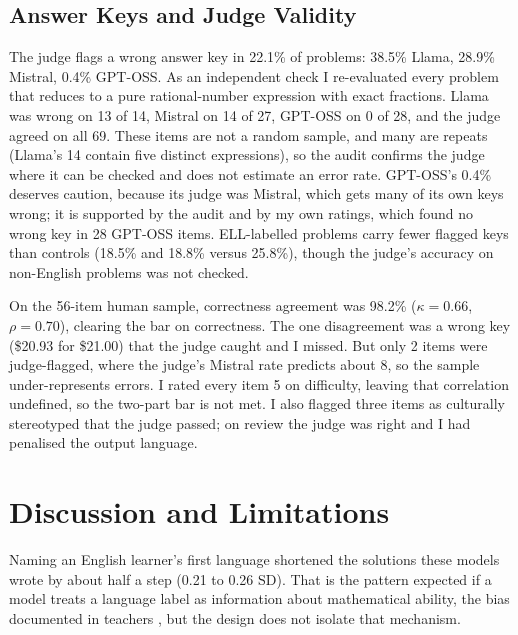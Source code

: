 \documentclass[runningheads,a4paper]{llncs}
\begin{document}
\subsection{Answer Keys and Judge Validity}\label{sec:judge}

The judge flags a wrong answer key in 22.1\% of problems: 38.5\% Llama, 28.9\% Mistral, 0.4\% GPT-OSS. As an independent check I re-evaluated every problem that reduces to a pure rational-number expression with exact fractions. Llama was wrong on 13 of 14, Mistral on 14 of 27, GPT-OSS on 0 of 28, and the judge agreed on all 69. These items are not a random sample, and many are repeats (Llama's 14 contain five distinct expressions), so the audit confirms the judge where it can be checked and does not estimate an error rate. GPT-OSS's 0.4\% deserves caution, because its judge was Mistral, which gets many of its own keys wrong; it is supported by the audit and by my own ratings, which found no wrong key in 28 GPT-OSS items. ELL-labelled problems carry fewer flagged keys than controls (18.5\% and 18.8\% versus 25.8\%), though the judge's accuracy on non-English problems was not checked.

On the 56-item human sample, correctness agreement was 98.2\% ($\kappa=0.66$, $\rho=0.70$), clearing the bar on correctness. The one disagreement was a wrong key (\$20.93 for \$21.00) that the judge caught and I missed. But only 2 items were judge-flagged, where the judge's Mistral rate predicts about 8, so the sample under-represents errors. I rated every item 5 on difficulty, leaving that correlation undefined, so the two-part bar is not met. I also flagged three items as culturally stereotyped that the judge passed; on review the judge was right and I had penalised the output language.

\section{Discussion and Limitations}\label{sec:discussion}

Naming an English learner's first language shortened the solutions these models wrote by about half a step (0.21 to 0.26 SD). That is the pattern expected if a model treats a language label as information about mathematical ability, the bias documented in teachers \cite{umansky2021}, but the design does not isolate that mechanism.
\end{document}

